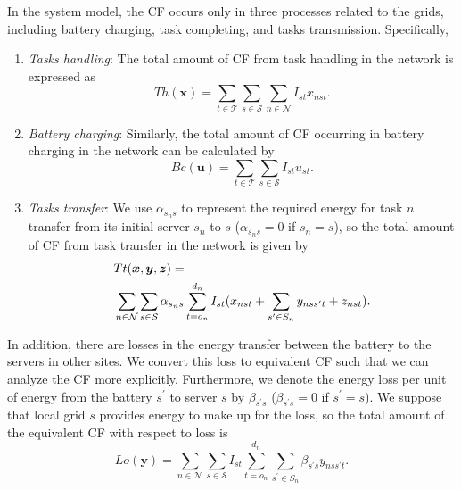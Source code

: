 \documentclass[conference, 10pt, ﬁnal, letterpaper, twocolumn]{IEEEtran}
\begin{document}
In the system model, the CF occurs only in three processes related to the grids, including battery charging, task completing, and tasks transmission. Specifically,
\begin{enumerate}
    \item {\em Tasks handling}: The total amount of CF from task handling in the network is expressed as
    \begin{equation}\label{th}
        Th(\boldsymbol{x}) = \sum_{t \in \mathcal{T}} \sum_{s\in \mathcal{S}} \sum_{n\in \mathcal{N}} I_{st}x_{nst}.
    \end{equation}
    \item {\em Battery charging}: Similarly, the total amount of CF occurring in battery charging in the network can be calculated by
    \begin{equation}\label{bc}
        Bc(\boldsymbol{u}) = \sum_{t \in \mathcal{T}} \sum_{s\in \mathcal{S}} I_{st}u_{st}.
    \end{equation}
    \item {\em Tasks transfer}: We use $\alpha_{s_n s}$ to represent the required energy for task $n$ transfer from its initial server $s_n$ to $s$ ($\alpha_{s_n s} = 0$ if $s_n = s$), so the total amount of CF from task transfer in the network is given by
    \begin{align}\label{tt}
        &Tt(\boldsymbol{x}, \boldsymbol{y}, \boldsymbol{z}) = \notag \\
        & \sum_{n \in \mathcal{N}} \sum_{s \in \mathcal{S}} \alpha_{s_n s} \sum^{d_n}_{t = o_n} I_{st} ( x_{nst} + \sum_{s^\prime \in S_n}  y _{nss^\prime t} + z_{nst}).
    \end{align}
\end{enumerate}
In addition, there are losses in the energy transfer between the battery to the servers in other sites. We convert this loss to equivalent CF such that we can analyze the CF more explicitly. Furthermore, we denote the energy loss per unit of energy from the battery $s^\prime$ to server $s$ by $\beta_{s^\prime s}$ ($\beta_{s^\prime s} = 0$ if $s^\prime = s$). We suppose that local grid $s$ provides energy to make up for the loss, so the total amount of the equivalent CF with respect to loss is 
\begin{equation}\label{lo}
    Lo(\boldsymbol{y}) = \sum_{n \in \mathcal{N}} \sum_{s \in \mathcal{S}} I_{st} \sum^{d_n}_{t = o_n}\sum_{s^\prime \in S_n}  \beta_{s^\prime s}  y _{nss^\prime t}.
\end{equation}
\end{document}
